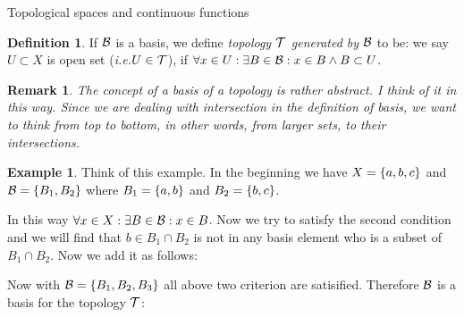 \documentclass{report}
\newtheorem*{remark}{Remark}
\theoremstyle{definition}
\newtheorem{definition}[theorem]{Definition}
\newtheorem{example}{Example}[theorem]
\newcommand{\set}[1]{\ensuremath\{#1\}}
\newcommand{\ie}{\textit{i.e.}\xspace}
\newcommand{\ex}{\ensuremath\exists}
\begin{document}
\begin{chapter}{Topological spaces and continuous functions}
\begin{definition}
    If $\mathcal{B}$ is a basis, we define \emph{topology $\mathcal{T}$ generated by
      $\mathcal{B}$} to be: we say $U\subset X$ is open set (\ie $U\in\mathcal{T}$), if
    $\forall x\in U: \exists B\in\mathcal{B}: x\in B \land B\subset U$.
  \end{definition}
  \begin{remark}
    The concept of a basis of a topology is rather abstract. I think
    of it in this way. Since we are dealing with intersection in the
    definition of basis, we want to think from top to bottom, in other
    words, from larger sets, to their intersections.
  \end{remark}
  \begin{example}
    Think of this example. In the beginning we have $X=\set{a,b,c}$
    and ${\B=\set{B_1,B_2}}$ where $B_1=\set{a,b}$ and
    $B_2=\set{b,c}$.

    \begin{figure}[H]
      \centering
    \end{figure}

    In this way $\forall x\in X :\ex B\in \B: x\in B$. Now we try to
    satisfy the second condition and we will find that
    $b\in B_1\cap B_2$ is not in any basis element who is a subset of
    $B_1\cap B_2$. Now we add it as follows:

    \begin{figure}[H]
      \centering
    \end{figure}

    Now with $\B=\set{B_1,B_2,B_3}$ all above two criterion are
    satisified. Therefore $\mathcal{B}$ is a basis for the topology $\mathcal{T}$:

    \begin{figure}[H]
      \centering
    \end{figure}
  \end{example}


\end{chapter}
\end{document}
